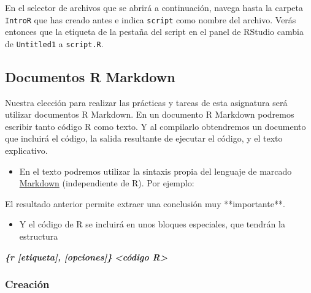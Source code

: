 \documentclass[
  degree=mecinf,
  title=normal,
  toc=normal,
  bib=normal]{mnye}
\providecommand{\tightlist}{%
  \setlength{\itemsep}{0pt}\setlength{\parskip}{0pt}}
\newenvironment{Shaded}{\begin{snugshade}}{\end{snugshade}}
\newcommand{\InformationTok}[1]{\textcolor[rgb]{0.56,0.35,0.01}{\textbf{\textit{#1}}}}
\newcommand{\NormalTok}[1]{#1}
\begin{document}
En el selector de archivos que se abrirá a continuación, navega hasta la carpeta \texttt{IntroR} que has creado antes e indica \texttt{script} como nombre del archivo. Verás entonces que la etiqueta de la pestaña del script en el panel de RStudio cambia de \texttt{Untitled1} a \texttt{script.R}.

\hypertarget{documentos-r-markdown}{%
\subsection{Documentos R Markdown}\label{documentos-r-markdown}}

Nuestra elección para realizar las prácticas y tareas de esta asignatura será utilizar documentos R Markdown. En un documento R Markdown podremos escribir tanto código \textsf{R} como texto. Y al compilarlo obtendremos un documento que incluirá el código, la salida resultante de ejecutar el código, y el texto explicativo.

\begin{itemize}
\tightlist
\item
  En el texto podremos utilizar la sintaxis propia del lenguaje de marcado \href{https://es.wikipedia.org/wiki/Markdown}{Markdown} (independiente de \textsf{R}). Por ejemplo:
\end{itemize}

\begin{Shaded}
\begin{Highlighting}[]
\NormalTok{El resultado anterior permite extraer una conclusión muy **importante**.}
\end{Highlighting}
\end{Shaded}

\begin{itemize}
\tightlist
\item
  Y el código de \textsf{R} se incluirá en unos bloques especiales, que tendrán la estructura
\end{itemize}

\begin{Shaded}
\begin{Highlighting}[]
\InformationTok{\textasciigrave{}\textasciigrave{}\textasciigrave{}\{r [etiqueta], [opciones]\}}
\InformationTok{\textless{}código R\textgreater{}}
\InformationTok{\textasciigrave{}\textasciigrave{}\textasciigrave{}}
\end{Highlighting}
\end{Shaded}

\hypertarget{creaciuxf3n}{%
\subsubsection{Creación}\label{creaciuxf3n}}
\end{document}
